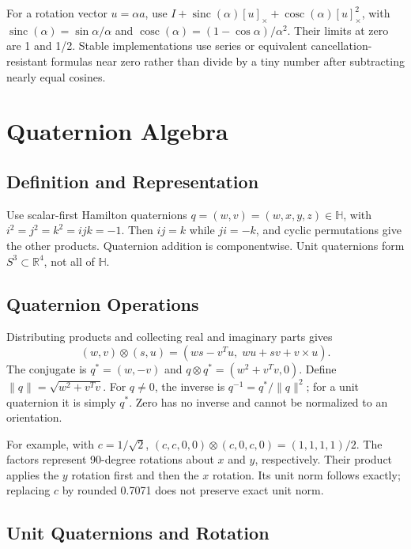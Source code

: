 For a rotation vector $u=\alpha a$, use $I+\operatorname{sinc}(\alpha)[u]_\times+\operatorname{cosc}(\alpha)[u]_\times^2$, with $\operatorname{sinc}(\alpha)=\sin\alpha/\alpha$ and $\operatorname{cosc}(\alpha)=(1-\cos\alpha)/\alpha^2$. Their limits at zero are 1 and 1/2. Stable implementations use series or equivalent cancellation-resistant formulas near zero rather than divide by a tiny number after subtracting nearly equal cosines.

\section{Quaternion Algebra}
\label{sec:quaternions}

\subsection{Definition and Representation}

Use scalar-first Hamilton quaternions $q=(w,v)=(w,x,y,z)\in\mathbb H$, with $i^2=j^2=k^2=ijk=-1$. Then $ij=k$ while $ji=-k$, and cyclic permutations give the other products. Quaternion addition is componentwise. Unit quaternions form $S^3\subset\mathbb R^4$, not all of $\mathbb H$.
\label{eq:quaternion_def}

\subsection{Quaternion Operations}

Distributing products and collecting real and imaginary parts gives
\begin{equation}
 (w,v)\otimes(s,u)=(ws-v^Tu,\;wu+sv+v\times u).
 \label{eq:hamilton_product}
\end{equation}
The conjugate is $q^*=(w,-v)$ and $q\otimes q^*=(w^2+v^Tv,0)$. Define $\|q\|=\sqrt{w^2+v^Tv}$. For $q\ne0$, the inverse is $q^{-1}=q^*/\|q\|^2$; for a unit quaternion it is simply $q^*$. Zero has no inverse and cannot be normalized to an orientation.

For example, with $c=1/\sqrt2$, $(c,c,0,0)\otimes(c,0,c,0)=(1,1,1,1)/2$. The factors represent 90-degree rotations about $x$ and $y$, respectively. Their product applies the $y$ rotation first and then the $x$ rotation. Its unit norm follows exactly; replacing $c$ by rounded 0.7071 does not preserve exact unit norm.

\subsection{Unit Quaternions and Rotation}
\label{thm:quaternion_rotation}
\label{laymans:quaternion_half_angle}

